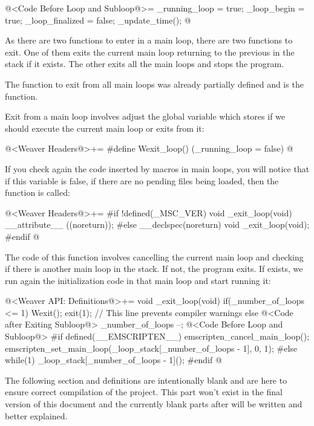 \iniciocodigo
@<Code Before Loop and Subloop@>=
_running_loop = true;
_loop_begin = true;
_loop_finalized = false;
_update_time();
@
\fimcodigo


As there are two functions to enter in a main loop, there are two
functions to exit. One of them exits the current main loop returning
to the previous in the stack if it exists. The other exits all the
main loops and stops the program.

The function to exit from all main loops was already partially defined
and is the  function.

Exit from a main loop involves adjust the global variable which stores
if we should execute the current main loop or exits from it:

\iniciocodigo
@<Weaver Headers@>+=
#define Wexit_loop() (_running_loop = false)
@
\fimcodigo

If you check again the code inserted by macros in main loops, you will
notice that if this variable is false, if there are no pending files
being loaded, then the function  is called:

\iniciocodigo
@<Weaver Headers@>+=
#if !defined(_MSC_VER)
void _exit_loop(void) __attribute__ ((noreturn));
#else
__declspec(noreturn) void _exit_loop(void);
#endif
@
\fimcodigo

The code of this function involves cancelling the current main loop
and checking if there is another main loop in the stack. If not, the
program exits.  If exists, we run again the initialization code in
that main loop and start running it:

\iniciocodigo
@<Weaver API: Definitions@>+=
void _exit_loop(void){
  if(_number_of_loops <= 1){
    Wexit();
    exit(1); // This line prevents compiler warnings
  }
  else{
    @<Code after Exiting Subloop@>
    _number_of_loops --;
    @<Code Before Loop and Subloop@>
#if defined(__EMSCRIPTEN__)
    emscripten_cancel_main_loop();
    emscripten_set_main_loop(_loop_stack[_number_of_loops - 1], 0, 1);
#else
    while(1)
      _loop_stack[_number_of_loops - 1]();
#endif
  }
}
@
\fimcodigo


The following section and definitions are intentionally blank and are
here to ensure correct compilation of the project. This part won't
exist in the final version of this document and the currently blank
parts after will be written and better explained.

